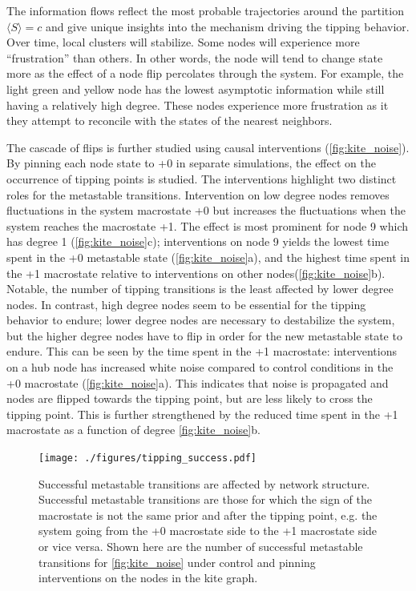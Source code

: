\documentclass[a4paper, 11pt, twocolumn]{article}
\begin{document}
The information flows reflect the most probable trajectories
around the partition \(\langle S \rangle  = c\) and give unique insights
into the mechanism driving  the tipping behavior. Over time,
local clusters  will stabilize.  Some nodes  will experience
more  ``frustration'' than  others. In  other words,  the node
will tend to change state more  as the effect of a node flip
percolates through the system.  For example, the light green
and yellow node has  the lowest asymptotic information while
still  having   a  relatively   high  degree.   These  nodes
experience more frustration as  it they attempt to reconcile
with the states of the nearest neighbors.

The  cascade  of  flips  is  further  studied  using  causal
interventions (\cref{fig:kite_noise}). By  pinning each node
state  to +0  in  separate simulations,  the  effect on  the
occurrence of  tipping points is studied.  The interventions
highlight two distinct roles for the metastable transitions.
Intervention on low degree nodes removes fluctuations in the
system macrostate +0 but increases the fluctuations when the
system  reaches  the  macrostate  +1.  The  effect  is  most
prominent    for    node    9    which    has    degree    1
(\cref{fig:kite_noise}{c}); interventions  on node  9 yields
the   lowest  time   spent  in   the  +0   metastable  state
(\cref{fig:kite_noise}{a}),  and the  highest time  spent in
the  +1  macrostate  relative   to  interventions  on  other
nodes(\cref{fig:kite_noise}{b}).  Notable,   the  number  of
tipping transitions  is the  least affected by  lower degree
nodes. In contrast,  high degree nodes seem  to be essential
for the tipping  behavior to endure; lower  degree nodes are
necessary to  destabilize the system, but  the higher degree
nodes have to flip in order  for the new metastable state to
endure.  This can  be  seen  by the  time  spent  in the  +1
macrostate: interventions on a  hub node has increased white
noise compared  to control  conditions in the  +0 macrostate
(\cref{fig:kite_noise}{a}).  This  indicates that  noise  is
propagated and nodes are  flipped towards the tipping point,
but  are less  likely to  cross the  tipping point.  This is
further strengthened  by the  reduced time  spent in  the +1
macrostate as a function of degree \cref{fig:kite_noise}{b}.


\begin{figure}[htbp]
\centering
\texttt{[image: ./figures/tipping\_success.pdf]}
\caption{\label{fig:tip_suc}Successful metastable transitions are affected by network structure. Successful metastable transitions are those for which the sign of the macrostate is not the same prior and after the tipping point, e.g. the system going from the +0 macrostate side to the +1 macrostate side or vice versa. Shown here are the number of successful metastable transitions for \cref{fig:kite_noise} under control and pinning interventions on the nodes in the kite graph.}
\end{figure}
\end{document}
